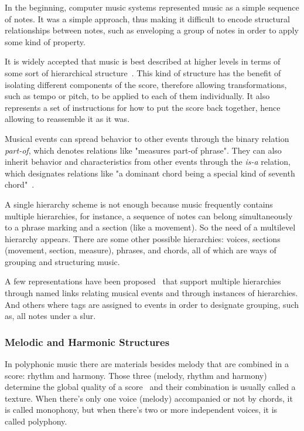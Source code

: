 \documentclass[a4paper,UKenglish]{oasics}
\begin{document}
    In the beginning, computer music systems represented music as a simple sequence of notes. It was
    a simple approach, thus making it difficult to encode structural relationships between notes,
    such as enveloping a group of notes in order to apply some kind of property.

    It is widely accepted that music is best described at higher levels in terms of some sort of
    hierarchical structure~\cite{balaban1987music}. This kind of structure has the benefit of
    isolating different components of the score, therefore allowing transformations, such as tempo
    or pitch, to be applied to each of them individually. It also represents a set of instructions
    for how to put the score back together, hence allowing to reassemble it as it was.

    Musical events can spread behavior to other events through the binary relation \textit{part-of},
    which denotes relations like "measures part-of phrase". They can also inherit behavior and
    characteristics from other events through the \textit{is-a} relation, which designates relations
    like "a dominant chord being a special kind of seventh chord"~\cite{Honing1993}.

    A single hierarchy scheme is not enough because music frequently contains multiple hierarchies,
    for instance, a sequence of notes can belong simultaneously to a phrase marking and a section
    (like a movement). So the need of a multilevel hierarchy appears. There are some other possible
    hierarchies: voices, sections (movement, section, measure), phrases, and chords, all of which
    are ways of grouping and structuring music.

    A few representations have been proposed~\cite{Dannenberg1990,Brinkman1984} that support
    multiple hierarchies through named links relating musical events and through instances of
    hierarchies. And others where tags are assigned to events in order to designate grouping, such
    as, all notes under a slur.

\subsubsection{Melodic and Harmonic Structures} 

    In polyphonic music there are materials besides melody that are combined in a score: rhythm and
    harmony. Those three (melody, rhythm and harmony) determine the global quality of a
    score~\cite{benward2003music} and their combination is usually called a texture. When there's
    only one voice (melody) accompanied or not by chords, it is called monophony, but when there's
    two or more independent voices, it is called polyphony.
\end{document}
